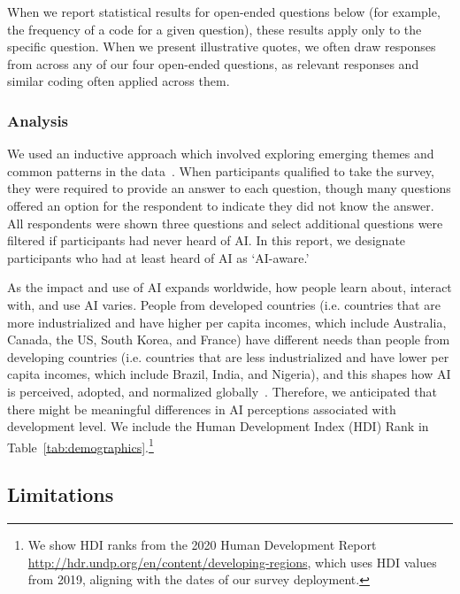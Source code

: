 \documentclass[sigconf]{acmart}
\begin{document}
When we report statistical results for open-ended questions below (for example, the frequency of a code for a given question), these results apply only to the specific question. When we present illustrative quotes, we often draw responses from across any of our four open-ended questions, as relevant responses and similar coding often applied across them.

\subsubsection{Analysis}\label{Analysis_Section}
We used an inductive approach which involved exploring emerging themes and common patterns in the data~\cite{hinkin1998brief}. 
When participants qualified to take the survey, they were required to provide an answer to each question, though many questions offered an option for the respondent to indicate they did not know the answer. All respondents were shown three questions and select additional questions were filtered if participants had never heard of AI. In this report, we designate participants who had at least heard of AI as `AI-aware.'

As the impact and use of AI expands worldwide, how people learn about, interact with, and use AI varies. People from developed countries (i.e. countries that are more industrialized and have higher per capita incomes, which include Australia, Canada, the US, South Korea, and France) have different needs than people from developing countries (i.e. countries that are less industrialized and have lower per capita incomes, which include Brazil, India, and Nigeria), and this shapes how AI is perceived, adopted, and normalized globally~\cite{un2014, sambasivan2019toward}. Therefore, we anticipated that there might be meaningful differences in AI perceptions associated with development level. We include the Human Development Index (HDI) Rank in Table~\ref{tab:demographics}.\footnote{We show HDI ranks from the 2020 Human Development Report \url{http://hdr.undp.org/en/content/developing-regions}, which uses HDI values from 2019, aligning with the dates of our survey deployment.} 







\subsection{Limitations}
\end{document}
